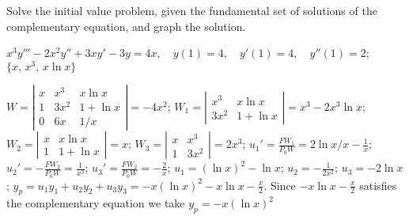 \documentclass{ximera}
\begin{document}
\begin{problem}\label{exer:9.4.22} Solve the
initial value problem, given the fundamental set of solutions of the complementary equation, and graph the solution.

$x^3y'''-2x^2y''+3xy'-3y=4x, \quad  y(1)=4,\quad y'(1)=4,
\quad y''(1)=2$; \quad     $\{x,\,x^3,\,x \ln x\}$

\begin{solution}
$W=\left|\begin{array}{cccc}
x&x^3&x\ln x\\1&3x^2&1+\ln x\\0&6x&1/x
\end{array}\right|=-4x^2$;
$W_1=\left|\begin{array}{cccc}
x^3&x\ln x\\3x^2&1+\ln x
\end{array}\right|=x^3-2x^3\ln x$;
$W_2=\left|\begin{array}{cccc}
x&x\ln x\\1&1+\ln x\end{array}\right|=x$;
$W_3=\left|\begin{array}{cccc}x&x^3\\1&3x^2
\end{array}\right|=2x^3$;
$u_1'=\frac{FW_1}{P_0W}=2\ln x/x-\frac{1}{x}$;
$u_2'=-\frac{FW_2}{P_0W}=\frac{1}{x^3}$;
$u_3'=\frac{FW_2}{P_0W}=-\frac{2}{x}$;
$u_1=(\ln x)^2-\ln x$;
$u_2=-\frac{1}{2x^2}$;
$u_3=-2\ln x$;
$y_p=u_1y_1+u_2y_2+u_3y_3=-x(\ln x)^2-x\ln x-\frac{x}{2}$.
Since $-x\ln x-\frac{x}{2}$ satisfies the complementary equation
we take $y_p=-x(\ln x)^2$



\end{solution}
\end{problem}
\end{document}
